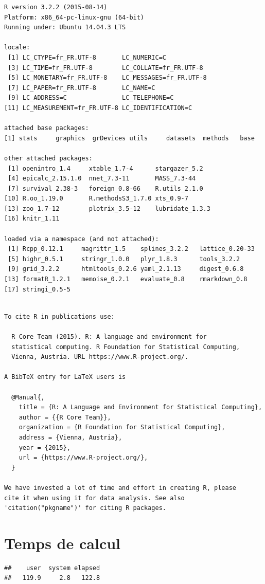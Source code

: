 \documentclass[]{article}
\begin{document}
\begin{verbatim}
R version 3.2.2 (2015-08-14)
Platform: x86_64-pc-linux-gnu (64-bit)
Running under: Ubuntu 14.04.3 LTS

locale:
 [1] LC_CTYPE=fr_FR.UTF-8       LC_NUMERIC=C              
 [3] LC_TIME=fr_FR.UTF-8        LC_COLLATE=fr_FR.UTF-8    
 [5] LC_MONETARY=fr_FR.UTF-8    LC_MESSAGES=fr_FR.UTF-8   
 [7] LC_PAPER=fr_FR.UTF-8       LC_NAME=C                 
 [9] LC_ADDRESS=C               LC_TELEPHONE=C            
[11] LC_MEASUREMENT=fr_FR.UTF-8 LC_IDENTIFICATION=C       

attached base packages:
[1] stats     graphics  grDevices utils     datasets  methods   base     

other attached packages:
 [1] openintro_1.4     xtable_1.7-4      stargazer_5.2    
 [4] epicalc_2.15.1.0  nnet_7.3-11       MASS_7.3-44      
 [7] survival_2.38-3   foreign_0.8-66    R.utils_2.1.0    
[10] R.oo_1.19.0       R.methodsS3_1.7.0 xts_0.9-7        
[13] zoo_1.7-12        plotrix_3.5-12    lubridate_1.3.3  
[16] knitr_1.11       

loaded via a namespace (and not attached):
 [1] Rcpp_0.12.1     magrittr_1.5    splines_3.2.2   lattice_0.20-33
 [5] highr_0.5.1     stringr_1.0.0   plyr_1.8.3      tools_3.2.2    
 [9] grid_3.2.2      htmltools_0.2.6 yaml_2.1.13     digest_0.6.8   
[13] formatR_1.2.1   memoise_0.2.1   evaluate_0.8    rmarkdown_0.8  
[17] stringi_0.5-5  
\end{verbatim}

\begin{verbatim}

To cite R in publications use:

  R Core Team (2015). R: A language and environment for
  statistical computing. R Foundation for Statistical Computing,
  Vienna, Austria. URL https://www.R-project.org/.

A BibTeX entry for LaTeX users is

  @Manual{,
    title = {R: A Language and Environment for Statistical Computing},
    author = {{R Core Team}},
    organization = {R Foundation for Statistical Computing},
    address = {Vienna, Austria},
    year = {2015},
    url = {https://www.R-project.org/},
  }

We have invested a lot of time and effort in creating R, please
cite it when using it for data analysis. See also
'citation("pkgname")' for citing R packages.
\end{verbatim}

\section{Temps de calcul}\label{temps-de-calcul}

\begin{verbatim}
##    user  system elapsed 
##   119.9     2.8   122.8
\end{verbatim}
\end{document}
